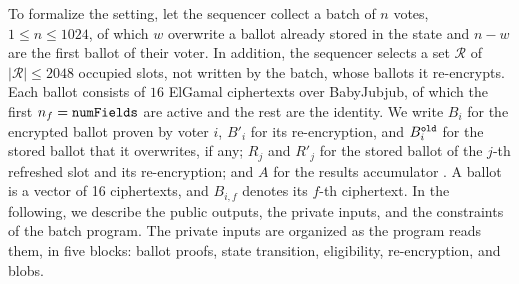 To formalize the setting, let the sequencer collect a batch of $n$ votes, $1 \le n \le 1024$, of which $w$ overwrite a ballot already stored in the state and $n - w$ are the first ballot of their voter. In addition, the sequencer selects a set $\mathcal{R}$ of $|\mathcal{R}| \le 2048$ occupied slots, not written by the batch, whose ballots it re-encrypts. Each ballot consists of $16$ ElGamal ciphertexts over BabyJubjub, of which the first $n_f = \texttt{numFields}$ are active and the rest are the identity. We write $B_i$ for the encrypted ballot proven by voter $i$, $B'_i$ for its re-encryption, and $B^\texttt{old}_i$ for the stored ballot that it overwrites, if any; $R_j$ and $R'_j$ for the stored ballot of the $j$-th refreshed slot and its re-encryption; and $A$ for the results accumulator \encresults. A ballot is a vector of 16 ciphertexts, and $B_{i,f}$ denotes its $f$-th ciphertext. In the following, we describe the public outputs, the private inputs, and the constraints of the batch program. The private inputs are organized as the program reads them, in five blocks: ballot proofs, state transition, eligibility, re-encryption, and blobs.

